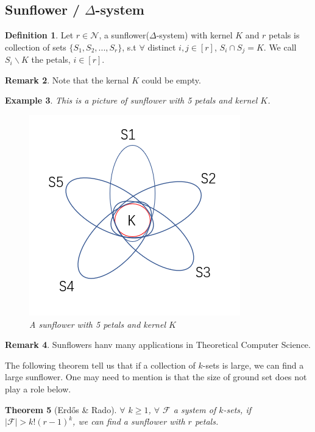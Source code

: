 \documentclass{article}
\newtheorem{theorem}{Theorem}[section]
\newtheorem{example}[theorem]{Example}
\theoremstyle{definition}
\newtheorem{remark}[theorem]{Remark}
\newtheorem{definition}[theorem]{Definition}
\def\Erdos{Erd\H{o}s}
\begin{document}
\subsection{Sunflower / $\Delta$-system}
\begin{definition}
    Let $r\in \mathcal{N}$, a sunflower($\Delta$-system) with kernel $K$ and $r$ petals is collection of sets $\{S_1,S_2,...,S_r\}$, s.t $\forall$ distinct $i,j\in [r]$, $S_i\cap S_j=K$. We call $S_i\backslash K$ the petals, $i\in [r]$.
\end{definition}

\begin{remark}
    Note that the kernal $K$ could be empty.
\end{remark}

\begin{example}
    This is a picture of sunflower with 5 petals and kernel $K$.
    \begin{figure}[H]
        \centering
        \includegraphics[scale=0.7]{15-3.png}
        \caption{A sunflower with 5 petals and kernel $K$}
    \end{figure}
\end{example}

\begin{remark}
    Sunflowers hanv many applications in Theoretical Computer Science.
\end{remark}
The following theorem tell us that if a collection of $k$-sets is large, we can find a large sunflower. One may need to mention is that the size of ground set does not play a role below. 

\begin{theorem}[\Erdos{} \& Rado\cite{Erds1961INTERSECTIONTF}]\label{thm15.16}
    $\forall$ $k\geq 1$, $\forall$ $\mathcal{F}$ a system of $k$-sets, if $|\mathcal{F}|>k!(r-1)^k$, we can find a sunflower with $r$ petals.
\end{theorem}
\end{document}
